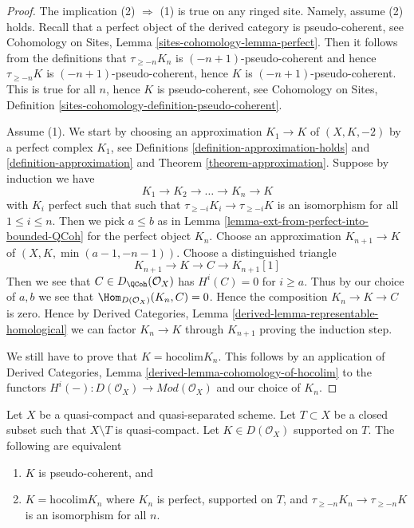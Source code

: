 \begin{proof}
The implication (2) $\Rightarrow$ (1) is true on any ringed site.
Namely, assume (2) holds. Recall that a perfect object of the derived
category is pseudo-coherent, see
Cohomology on Sites, Lemma \ref{sites-cohomology-lemma-perfect}.
Then it follows from the definitions that
$\tau_{\geq -n}K_n$ is $(-n + 1)$-pseudo-coherent
and hence $\tau_{\geq -n}K$ is $(-n + 1)$-pseudo-coherent,
hence $K$ is $(-n + 1)$-pseudo-coherent. This is true for
all $n$, hence $K$ is pseudo-coherent, see
Cohomology on Sites, Definition
\ref{sites-cohomology-definition-pseudo-coherent}.

\medskip\noindent
Assume (1). We start by choosing an approximation
$K_1 \to K$ of $(X, K, -2)$ by a perfect complex $K_1$, see
Definitions \ref{definition-approximation-holds} and
\ref{definition-approximation} and
Theorem \ref{theorem-approximation}.
Suppose by induction we have
$$
K_1 \to K_2 \to \ldots \to K_n \to K
$$
with $K_i$ perfect such that
such that $\tau_{\geq -i}K_i \to \tau_{\geq -i}K$ is an isomorphism
for all $1 \leq i \leq n$. Then we pick $a \leq b$ as in
Lemma \ref{lemma-ext-from-perfect-into-bounded-QCoh}
for the perfect object $K_n$. Choose an approximation
$K_{n + 1} \to K$ of $(X, K, \min(a - 1, -n - 1))$.
Choose a distinguished triangle
$$
K_{n + 1} \to K \to C \to K_{n + 1}[1]
$$
Then we see that $C \in D_\QCoh(\mathcal{O}_X)$ has
$H^i(C) = 0$ for $i \geq a$. Thus by our choice of $a, b$
we see that $\Hom_{D(\mathcal{O}_X)}(K_n, C) = 0$.
Hence the composition $K_n \to K \to C$ is zero. Hence by
Derived Categories, Lemma \ref{derived-lemma-representable-homological}
we can factor $K_n \to K$ through $K_{n + 1}$
proving the induction step.

\medskip\noindent
We still have to prove that $K = \text{hocolim} K_n$.
This follows by an application of
Derived Categories, Lemma \ref{derived-lemma-cohomology-of-hocolim}
to the functors
$H^i( - ) : D(\mathcal{O}_X) \to \textit{Mod}(\mathcal{O}_X)$
and our choice of $K_n$.
\end{proof}

\begin{lemma}
\label{lemma-pseudo-coherent-hocolim-with-support}
Let $X$ be a quasi-compact and quasi-separated scheme.
Let $T \subset X$ be a closed subset such that $X \setminus T$
is quasi-compact. Let $K \in D(\mathcal{O}_X)$ supported on $T$.
The following are equivalent
\begin{enumerate}
\item $K$ is pseudo-coherent, and
\item $K = \text{hocolim} K_n$ where
$K_n$ is perfect, supported on $T$, and
$\tau_{\geq -n}K_n \to \tau_{\geq -n}K$ is an isomorphism for all $n$.
\end{enumerate}
\end{lemma}

